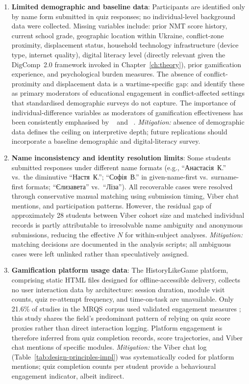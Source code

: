 \begin{enumerate}
\item \textbf{Limited demographic and baseline data}: Participants are identified only by name form submitted in quiz responses; no individual-level background data were collected. Missing variables include: prior NMT score history, current school grade, geographic location within Ukraine, conflict-zone proximity, displacement status, household technology infrastructure (device type, internet quality), digital literacy level (directly relevant given the DigComp~2.0 framework invoked in Chapter~\ref{ch:theory}), prior gamification experience, and psychological burden measures. The absence of conflict-proximity and displacement data is a wartime-specific gap: \cite{UNESCO2023} and \cite{Humeniuk2022113} identify these as primary moderators of educational engagement in conflict-affected settings that standardised demographic surveys do not capture. The importance of individual-difference variables as moderators of gamification effectiveness has been consistently emphasised by \citeauthor{KoivistoHamari2019}~\cite{KoivistoHamari2019} and \citeauthor{Hamari2014}~\cite{Hamari2014}. \textit{Mitigation:} absence of demographic data defines the ceiling on interpretive depth; future replications should incorporate a baseline demographic and digital-literacy survey.

\item \textbf{Name inconsistency and identity resolution limits}: Some students submitted responses under different name formats (e.g., ``Анастасія~К.'' vs.\ the diminutive ``Настя~К.''; ``Софія~В.'' in given-name-first vs.\ surname-first formats; ``Єлизавета'' vs.\ ``Ліза''). All recoverable cases were resolved through conservative manual matching using submission timing, Viber chat mentions, and participation patterns. However, the residual gap of approximately 28 students between Viber cohort size and matched individual records is partly attributable to irresolvable name ambiguity and anonymous submissions, reducing the effective $N$ for within-subject analyses. \textit{Mitigation:} matching decisions are documented in the analysis scripts; all ambiguous cases were left unlinked rather than speculatively assigned.

\item \textbf{Gamification platform usage data}: The HistoryLikeGame platform, comprising static HTML files designed for offline-accessible delivery, collects no user interaction data by architecture: session duration, module visit counts, quiz re-attempt frequency, and time-on-task are unavailable. Only 21.6\% of studies in the MRQS corpus used validated engagement measures \cite{Korniienko2025mrqs}; this study shares the field's predominant pattern of relying on quiz score proxies rather than direct interaction logging. Platform engagement is therefore inferred from quiz completion records, score trajectories, and Viber chat mentions of specific modules. \textit{Mitigation:} the Viber chat log (Table~\ref{tab:design-principles-impl}) was systematically coded for platform mentions; quiz completion counts per student provide a behavioural engagement indicator, albeit indirect.


\end{enumerate}
